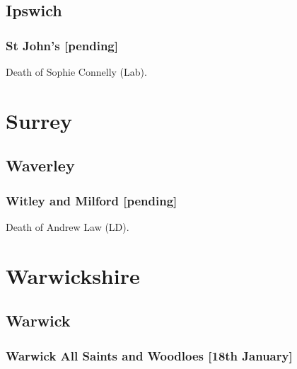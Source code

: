 \documentclass[a4paper,openany]{book}
\begin{document}
\begin{resultsiii}
\subsection*{Ipswich}

\subsubsection*{St John's \hspace*{\fill}\nolinebreak[1]%
	\enspace\hspace*{\fill}
	[pending]}


Death of Sophie Connelly (Lab).

\section{Surrey}

\subsection*{Waverley}

\subsubsection*{Witley and Milford \hspace*{\fill}\nolinebreak[1]%
	\enspace\hspace*{\fill}
	[pending]}


Death of Andrew Law (LD).

\section{Warwickshire}

\subsection*{Warwick}

\subsubsection*{Warwick All Saints and Woodloes \hspace*{\fill}\nolinebreak[1]%
	\enspace\hspace*{\fill}
	[18th January]}


\end{resultsiii}
\end{document}
